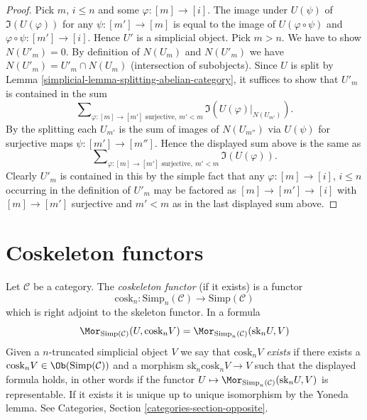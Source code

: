 \begin{proof}

Pick $m$, $i \leq n$ and some $\varphi : [m] \to [i]$.
The image under $U(\psi)$ of $\Im(U(\varphi))$
for any $\psi : [m'] \to [m]$ is
equal to the image of $U(\varphi \circ \psi)$ and
$\varphi \circ \psi : [m'] \to [i]$.
Hence $U'$ is a simplicial object.
Pick $m > n$. We have to show $N(U'_m) = 0$.
By definition of $N(U_m)$ and $N(U'_m)$ we have
$N(U'_m) = U'_m \cap N(U_m)$ (intersection of subobjects).
Since $U$ is split by Lemma \ref{simplicial-lemma-splitting-abelian-category},
it suffices to show that $U'_m$ is contained in the sum
$$
\sum\nolimits_{\varphi : [m] \to [m']\text{ surjective}, \ m' < m}
\Im(U(\varphi)|_{N(U_{m'})}).
$$
By the splitting each $U_{m'}$ is the sum of images of
$N(U_{m''})$ via $U(\psi)$ for surjective maps
$\psi : [m'] \to [m'']$. Hence the displayed sum above
is the same as
$$
\sum\nolimits_{\varphi : [m] \to [m']\text{ surjective}, \ m' < m}
\Im(U(\varphi)).
$$
Clearly $U'_m$ is contained in this by the simple fact that
any $\varphi : [m] \to [i]$, $i \leq n$ occurring in the definition
of $U'_m$ may be factored as
$[m] \to [m'] \to [i]$ with $[m] \to [m']$ surjective
and $m' < m$ as in the last displayed sum above.
\end{proof}

\section{Coskeleton functors}
\label{simplicial-section-coskeleton}
Let $\mathcal{C}$ be a category.
The {\it coskeleton functor} (if it exists) is a functor
$$
\text{cosk}_n :
\text{Simp}_n(\mathcal{C}) \longrightarrow \text{Simp}(\mathcal{C})
$$
which is right adjoint to the skeleton functor. In a formula
\begin{equation}
\label{equation-cosk}
\Mor_{\text{Simp}(\mathcal{C})}(U, \text{cosk}_n V)
=
\Mor_{\text{Simp}_n(\mathcal{C})}(\text{sk}_n U, V)
\end{equation}
Given a $n$-truncated simplicial object $V$ we
say that {\it $\text{cosk}_nV$ exists} if there
exists a $\text{cosk}_nV \in \Ob(\text{Simp}(\mathcal{C}))$
and a morphism $\text{sk}_n \text{cosk}_n V \to V$
such that the displayed formula holds, in other words
if the functor
$U \mapsto \Mor_{\text{Simp}_n(\mathcal{C})}(\text{sk}_n U, V)$
is representable. If it exists it
is unique up to unique isomorphism by the Yoneda lemma.
See Categories, Section \ref{categories-section-opposite}.

